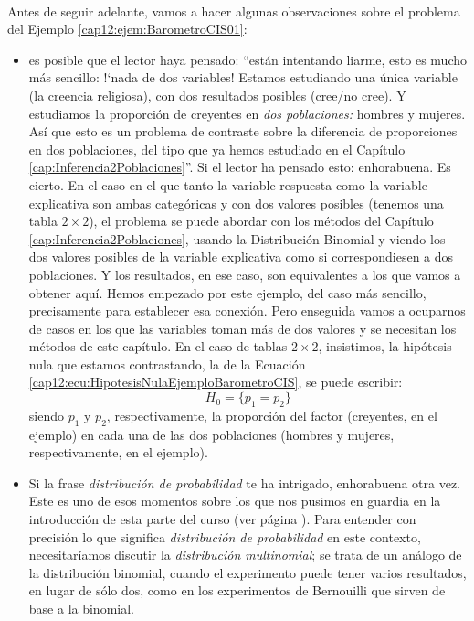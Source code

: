 \paragraph*{}
\label{cap12:lugar:observacionesEjemploBarometro}
Antes de seguir adelante, vamos a hacer algunas observaciones sobre el problema del Ejemplo \ref{cap12:ejem:BarometroCIS01}:
\begin{itemize}
    \item es posible que el lector haya pensado: ``están intentando liarme, esto es mucho más sencillo: {!`}nada de dos variables! Estamos estudiando una única variable (la creencia religiosa), con dos resultados posibles (cree/no cree). Y estudiamos la proporción de creyentes en {\em dos poblaciones:} hombres y mujeres. Así que esto es un problema de contraste sobre la diferencia de proporciones en dos poblaciones, del tipo que ya hemos estudiado en el Capítulo \ref{cap:Inferencia2Poblaciones}''. Si el lector ha pensado esto: enhorabuena. Es cierto. En el caso en el que tanto la variable respuesta como la variable explicativa son ambas categóricas y con dos valores posibles (tenemos una tabla $2\times 2$), el problema se puede abordar con los métodos del Capítulo \ref{cap:Inferencia2Poblaciones}, usando la Distribución Binomial y viendo los dos valores posibles de la variable explicativa como si correspondiesen a dos poblaciones. Y los resultados, en ese caso, son equivalentes a los que vamos a obtener aquí. Hemos empezado por este ejemplo, del caso más sencillo, precisamente para establecer esa conexión. Pero enseguida vamos a ocuparnos de casos en los que las variables toman más de dos valores y se necesitan los métodos de este capítulo. En el caso de tablas $2\times 2$, insistimos, la hipótesis nula que estamos contrastando, la de la Ecuación \ref{cap12:ecu:HipotesisNulaEjemploBarometroCIS}, se puede escribir:
        \begin{equation}
        \label{cap12:ecu:HipotesisNulaEjemploBarometroCisVersionProporciones}
        H_0=\{p_1=p_2\}
        \end{equation}
        siendo $p_1$ y $p_2$, respectivamente, la proporción del factor (creyentes, en el ejemplo) en cada una de las dos poblaciones (hombres y mujeres, respectivamente, en el ejemplo).

    \item Si la frase {\em distribución de probabilidad} te ha intrigado, enhorabuena otra vez. Este es uno de esos momentos sobre los que nos pusimos en guardia en la introducción de esta parte del curso (ver página \pageref{part04:intro}). Para entender con precisión lo que significa {\em distribución de probabilidad} en este contexto, necesitaríamos discutir la {\em distribución multinomial}; se trata de un análogo de la distribución binomial, cuando el experimento puede tener varios resultados, en lugar de sólo dos, como en los experimentos de Bernouilli que sirven de base a la binomial.



\end{itemize}
